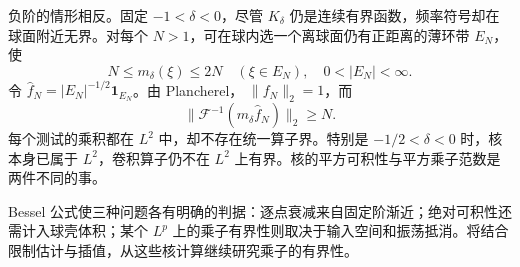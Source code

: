 负阶的情形相反。固定 \(-1<\delta<0\)，尽管 \(K_\delta\) 仍是连续有界函数，频率符号却在球面附近无界。对每个 \(N>1\)，可在球内选一个离球面仍有正距离的薄环带 \(E_N\)，使
\[
 N\leq m_\delta(\xi)\leq2N
 \quad(\xi\in E_N),\quad 0<|E_N|<\infty.
\]
令 \(\widehat f_N=|E_N|^{-1/2}\mathbf1_{E_N}\)。由 Plancherel，
\(\|f_N\|_2=1\)，而
\[
 \|\mathcal F^{-1}(m_\delta\widehat f_N)\|_2\geq N.
\]
每个测试的乘积都在 \(L^2\) 中，却不存在统一算子界。特别是
\(-1/2<\delta<0\) 时，核本身已属于 \(L^2\)，卷积算子仍不在 \(L^2\) 上有界。核的平方可积性与平方乘子范数是两件不同的事。

\ProseParagraphBreak

Bessel 公式使三种问题各有明确的判据：逐点衰减来自固定阶渐近；绝对可积性还需计入球壳体积；某个 \(L^p\) 上的乘子有界性则取决于输入空间和振荡抵消。将结合限制估计与插值，从这些核计算继续研究乘子的有界性。
